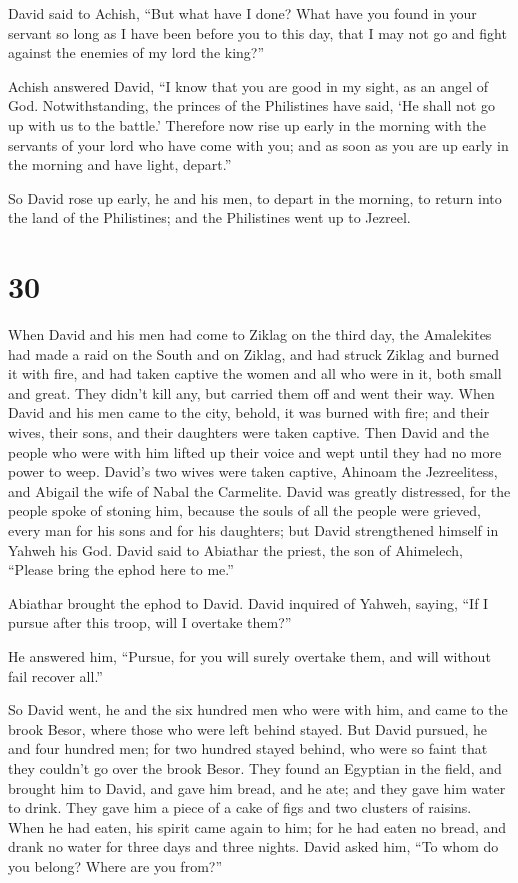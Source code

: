  David said to Achish, ``But what have I done? What have you
found in your servant so long as I have been before you to this day,
that I may not go and fight against the enemies of my lord the king?''

 Achish answered David, ``I know that you are good in my
sight, as an angel of God. Notwithstanding, the princes of the
Philistines have said, `He shall not go up with us to the battle.'
 Therefore now rise up early in the morning with the
servants of your lord who have come with you; and as soon as you are up
early in the morning and have light, depart.''

 So David rose up early, he and his men, to depart in the
morning, to return into the land of the Philistines; and the Philistines
went up to Jezreel.

\hypertarget{section-29}{%
\section{30}\label{section-29}}

 When David and his men had come to Ziklag on the third day,
the Amalekites had made a raid on the South and on Ziklag, and had
struck Ziklag and burned it with fire,  and had taken
captive the women and all who were in it, both small and great. They
didn't kill any, but carried them off and went their way. 
When David and his men came to the city, behold, it was burned with
fire; and their wives, their sons, and their daughters were taken
captive.  Then David and the people who were with him lifted
up their voice and wept until they had no more power to weep.
 David's two wives were taken captive, Ahinoam the
Jezreelitess, and Abigail the wife of Nabal the Carmelite. 
David was greatly distressed, for the people spoke of stoning him,
because the souls of all the people were grieved, every man for his sons
and for his daughters; but David strengthened himself in Yahweh his God.
 David said to Abiathar the priest, the son of Ahimelech,
``Please bring the ephod here to me.''

Abiathar brought the ephod to David.  David inquired of
Yahweh, saying, ``If I pursue after this troop, will I overtake them?''

He answered him, ``Pursue, for you will surely overtake them, and will
without fail recover all.''

 So David went, he and the six hundred men who were with
him, and came to the brook Besor, where those who were left behind
stayed.  But David pursued, he and four hundred men; for
two hundred stayed behind, who were so faint that they couldn't go over
the brook Besor.  They found an Egyptian in the field, and
brought him to David, and gave him bread, and he ate; and they gave him
water to drink.  They gave him a piece of a cake of figs
and two clusters of raisins. When he had eaten, his spirit came again to
him; for he had eaten no bread, and drank no water for three days and
three nights.  David asked him, ``To whom do you belong?
Where are you from?''

